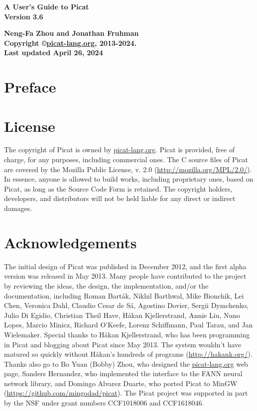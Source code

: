 \documentclass[11pt]{report}
\begin{document}
\vspace*{4cm}
\begin{center}
{\Huge\bf A User's Guide to Picat} \\
{\large\bf Version 3.6} \\


\vspace*{1cm}

{\large\bf Neng-Fa Zhou and Jonathan Fruhman} \\
\vspace*{1cm}
{\bf Copyright \copyright \url{picat-lang.org}, 2013-2024.} \\
{\bf Last updated April 26, 2024} \\
\end{center}
\thispagestyle{empty}
\clearpage

\pagestyle{plain}

\section*{Preface}


\clearpage
\section*{License}
The copyright of Picat is owned by \url{picat-lang.org}. Picat is provided, free of charge, for any purposes, including commercial ones. The C source files of Picat are covered by the Mozilla Public License, v. 2.0 (\url{http://mozilla.org/MPL/2.0/}). In essence, anyone is allowed to build works, including proprietary ones, based on Picat, as long as the Source Code Form is retained. The copyright holders, developers, and distributors will not be held liable for any direct or indirect damages.

 
\section*{Acknowledgements}
The initial design of Picat was published in December 2012, and the first alpha version was released in May 2013.  Many people have contributed to the project by reviewing the ideas, the design, the implementation, and/or the documentation, including Roman Bart\'{a}k, Nikhil Barthwal, Mike Bionchik, Lei Chen, Veronica Dahl, Claudio Cesar de S\'{a}, Agostino Dovier, Sergii Dymchenko, Julio Di Egidio, Christian Theil Have, H{\aa}kan Kjellerstrand,  Annie Liu, Nuno Lopes, Marcio Minicz, Richard O'Keefe, Lorenz Schiffmann, Paul Tarau, and Jan Wielemaker.  Special thanks to H{\aa}kan Kjellerstrand, who has been programming in Picat and blogging about Picat since May 2013. The system wouldn't have matured so quickly without H{\aa}kan's hundreds of programs (\url{http://hakank.org/}). Thanks also go to Bo Yuan (Bobby) Zhou, who designed the \url{picat-lang.org} web page, Sanders Hernandez, who implemented the interface to the FANN neural network library, and Domingo Alvarez Duarte, who ported Picat to MinGW (\url{https://github.com/mingodad/picat}). The Picat project was supported in part by the NSF under grant numbers CCF1018006 and CCF1618046.
\end{document}
